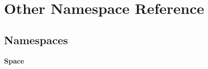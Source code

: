 \section{Other Namespace Reference}
\label{namespace_other}
\subsection*{Namespaces}
\begin{DoxyCompactItemize}
\item 
 {\bf Space}
\end{DoxyCompactItemize}
